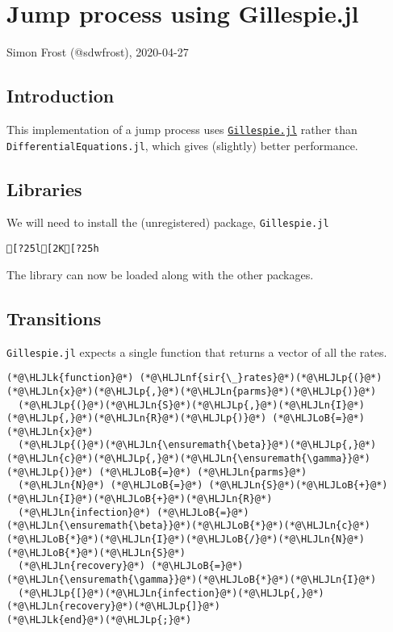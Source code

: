 \documentclass[12pt,a4paper]{article}
\newcommand{\HLJLk}[1]{\textcolor[RGB]{148,91,176}{\textbf{#1}}}
\newcommand{\HLJLn}[1]{#1}
\newcommand{\HLJLnf}[1]{\textcolor[RGB]{66,102,213}{#1}}
\newcommand{\HLJLoB}[1]{\textcolor[RGB]{102,102,102}{\textbf{#1}}}
\newcommand{\HLJLp}[1]{#1}
\begin{document}
\section{Jump process using Gillespie.jl}
Simon Frost (@sdwfrost), 2020-04-27

\subsection{Introduction}
This implementation of a jump process uses \href{https://github.com/sdwfrost/Gillespie.jl}{\texttt{Gillespie.jl}} rather than \texttt{DifferentialEquations.jl}, which gives (slightly) better performance.

\subsection{Libraries}
We will need to install the (unregistered) package, \texttt{Gillespie.jl}


\begin{lstlisting}
[?25l[2K[?25h
\end{lstlisting}


The library can now be loaded along with the other packages.



\subsection{Transitions}
\texttt{Gillespie.jl} expects a single function that returns a vector of all the rates.


\begin{lstlisting}
(*@\HLJLk{function}@*) (*@\HLJLnf{sir{\_}rates}@*)(*@\HLJLp{(}@*)(*@\HLJLn{x}@*)(*@\HLJLp{,}@*)(*@\HLJLn{parms}@*)(*@\HLJLp{)}@*)
  (*@\HLJLp{(}@*)(*@\HLJLn{S}@*)(*@\HLJLp{,}@*)(*@\HLJLn{I}@*)(*@\HLJLp{,}@*)(*@\HLJLn{R}@*)(*@\HLJLp{)}@*) (*@\HLJLoB{=}@*) (*@\HLJLn{x}@*)
  (*@\HLJLp{(}@*)(*@\HLJLn{\ensuremath{\beta}}@*)(*@\HLJLp{,}@*)(*@\HLJLn{c}@*)(*@\HLJLp{,}@*)(*@\HLJLn{\ensuremath{\gamma}}@*)(*@\HLJLp{)}@*) (*@\HLJLoB{=}@*) (*@\HLJLn{parms}@*)
  (*@\HLJLn{N}@*) (*@\HLJLoB{=}@*) (*@\HLJLn{S}@*)(*@\HLJLoB{+}@*)(*@\HLJLn{I}@*)(*@\HLJLoB{+}@*)(*@\HLJLn{R}@*)
  (*@\HLJLn{infection}@*) (*@\HLJLoB{=}@*) (*@\HLJLn{\ensuremath{\beta}}@*)(*@\HLJLoB{*}@*)(*@\HLJLn{c}@*)(*@\HLJLoB{*}@*)(*@\HLJLn{I}@*)(*@\HLJLoB{/}@*)(*@\HLJLn{N}@*)(*@\HLJLoB{*}@*)(*@\HLJLn{S}@*)
  (*@\HLJLn{recovery}@*) (*@\HLJLoB{=}@*) (*@\HLJLn{\ensuremath{\gamma}}@*)(*@\HLJLoB{*}@*)(*@\HLJLn{I}@*)
  (*@\HLJLp{[}@*)(*@\HLJLn{infection}@*)(*@\HLJLp{,}@*)(*@\HLJLn{recovery}@*)(*@\HLJLp{]}@*)
(*@\HLJLk{end}@*)(*@\HLJLp{;}@*)
\end{lstlisting}
\end{document}
